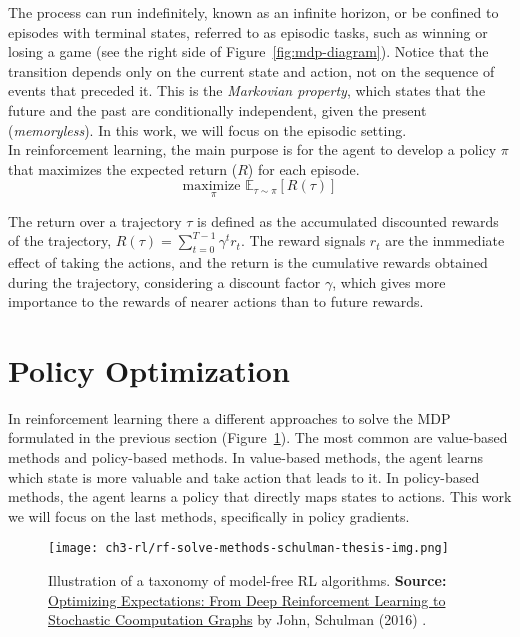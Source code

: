 \noindent The process can run indefinitely, known as an infinite horizon, or be confined to episodes with terminal states, referred to as episodic tasks, such as winning or losing a game (see the right side of Figure~\ref{fig:mdp-diagram}). Notice that the transition depends only on the current state and action, not on the sequence of events that preceded it. This is the \textit{Markovian property}, which states that the future and the past are conditionally independent, given the present (\textit{memoryless}). In this work, we will focus on the episodic setting. \\

\noindent In reinforcement learning, the main purpose is for the agent to develop a policy $\pi$ that maximizes the expected return ($R$) for each episode. \\

\begin{equation*}
    \underset{\pi}{\text{maximize }} \mathbb{E}_{\tau\sim\pi}\left[R(\tau)\right]
\end{equation*}

\noindent The return over a trajectory $\tau$ is defined as the accumulated discounted rewards of the trajectory, $R(\tau) = \sum_{t=0}^{T-1}\gamma^{t}r_{t}$. The reward signals $r_{t}$ are the inmmediate effect of taking the actions, and the return is the cumulative rewards obtained during the trajectory, considering a discount factor $\gamma$, which gives more importance to the rewards of nearer actions than to future rewards. 


\section{Policy Optimization}

In reinforcement learning there a different approaches to solve the MDP formulated in the previous section (Figure~\ref{fig:rl-model-free-taxonomy}). The most common are value-based methods and policy-based methods. In value-based methods, the agent learns which state is more valuable and
take action that leads to it.
In policy-based methods, the agent learns a policy that directly maps states to actions. This work we will focus on the last methods, specifically in policy gradients. \\

\begin{figure}[ht]
    \centering
    \texttt{[image: ch3-rl/rf-solve-methods-schulman-thesis-img.png]}
    \captionsetup{width=\textwidth} %
    \caption{Illustration of a taxonomy of model-free RL algorithms. \textbf{Source:} \href{https://rail.eecs.berkeley.edu/deeprlcourse/}{Optimizing Expectations: From Deep Reinforcement Learning to Stochastic Coomputation Graphs} by John, Schulman (2016) \cite{schulman2016optimizing}.}
    \label{fig:rl-model-free-taxonomy}
  \end{figure}

